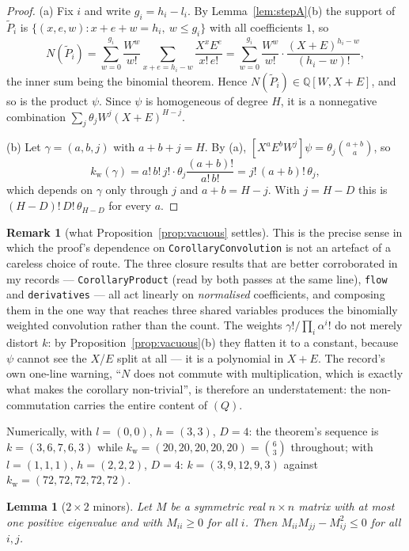 \documentclass[11pt]{article}
\theoremstyle{plain}
\newtheorem{lemma}[theorem]{Lemma}
\theoremstyle{definition}
\newtheorem{remark}[theorem]{Remark}
\newcommand{\Pt}{\widetilde P}
\begin{document}
\begin{proof}
(a) Fix $i$ and write $g_i=h_i-l_i$. By Lemma~\ref{lem:stepA}(b) the support of $\Pt_i$ is
$\{(x,e,w):x+e+w=h_i,\ w\le g_i\}$ with all coefficients $1$, so
\[
  N(\Pt_i)=\sum_{w=0}^{g_i}\frac{W^w}{w!}\sum_{x+e=h_i-w}\frac{X^xE^e}{x!\,e!}
  =\sum_{w=0}^{g_i}\frac{W^w}{w!}\cdot\frac{(X+E)^{h_i-w}}{(h_i-w)!},
\]
the inner sum being the binomial theorem. Hence $N(\Pt_i)\in\mathbb Q[W,X+E]$, and so is the
product $\psi$. Since $\psi$ is homogeneous of degree $H$, it is a nonnegative combination
$\sum_j\theta_jW^j(X+E)^{H-j}$.

(b) Let $\gamma=(a,b,j)$ with $a+b+j=H$. By (a),
$[X^aE^bW^j]\psi=\theta_j\binom{a+b}{a}$, so
\[
  k_{\mathrm w}(\gamma)=a!\,b!\,j!\cdot\theta_j\frac{(a+b)!}{a!\,b!}=j!\,(a+b)!\,\theta_j ,
\]
which depends on $\gamma$ only through $j$ and $a+b=H-j$. With $j=H-D$ this is
$(H-D)!\,D!\,\theta_{H-D}$ for every $a$.
\end{proof}

\begin{remark}[what Proposition~\ref{prop:vacuous} settles]
This is the precise sense in which the proof's dependence on \texttt{CorollaryConvolution}
is not an artefact of a careless choice of route. The three closure results that are
better corroborated in my records --- \texttt{CorollaryProduct} (read by both passes at the
same line), \texttt{flow} and \texttt{derivatives} --- all act linearly on
\emph{normalised} coefficients, and composing them in the one way that reaches three shared
variables produces the binomially weighted convolution rather than the count. The weights
$\gamma!/\prod_i\alpha^{i}!$ do not merely distort $k$: by
Proposition~\ref{prop:vacuous}(b) they flatten it to a constant, because $\psi$ cannot see
the $X$/$E$ split at all --- it is a polynomial in $X+E$. The record's own one-line
warning, ``$N$ does not commute with multiplication, which is exactly what makes the
corollary non-trivial'', is therefore an understatement: the non-commutation carries the
entire content of $(Q)$.

Numerically, with $l=(0,0)$, $h=(3,3)$, $D=4$: the theorem's sequence is
$k=(3,6,7,6,3)$ while $k_{\mathrm w}=(20,20,20,20,20)=\binom{6}{3}$ throughout; with
$l=(1,1,1)$, $h=(2,2,2)$, $D=4$: $k=(3,9,12,9,3)$ against
$k_{\mathrm w}=(72,72,72,72,72)$.
\end{remark}

\begin{lemma}[$2\times2$ minors]\label{lem:minor}
Let $M$ be a symmetric real $n\times n$ matrix with at most one positive eigenvalue and
with $M_{ii}\ge0$ for all $i$. Then $M_{ii}M_{jj}-M_{ij}^2\le0$ for all $i,j$.
\end{lemma}
\end{document}
